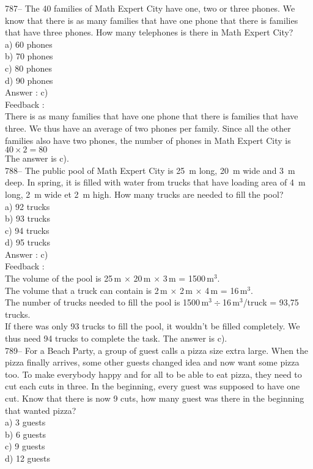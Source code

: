 \documentclass[letterpaper, 12pt]{article}
\begin{document}
787-- The 40 families of Math Expert City have one, two or three phones. We know that there is as many families that have one phone that there is families that have three phones. How many telephones is there in Math Expert City?\\
a) 60 phones\\
b) 70 phones\\
c) 80 phones\\
d) 90 phones\\

Answer : c)\\

Feedback : \\
There is as many families that have one phone that there is families that have three. We thus have an average of two phones per family. Since all the other families also have two phones, the number of phones in Math Expert City is $40\times2=80$\\
The answer is c).\\

788-- The public pool of Math Expert City is 25~m long, 20~m wide and 3~m deep. In spring, it is filled with water from trucks that have loading area of 4~m long, 2~m wide et 2~m high.
How many trucks are needed to fill the pool? \\
a) 92 trucks\\
b) 93 trucks\\
c) 94 trucks\\
d) 95 trucks\\

Answer : c)\\

Feedback : \\
The volume of the pool is 25\,m $\times$ 20\,m $\times$ 3\,m =
1500\,m$^{3}$.\\
The volume that a truck can contain is 2\,m $\times$ 2\,m $\times$ 4\,m =
16\,m$^{3}$.\\
The number of trucks needed to fill the pool is
1500\,m$^{3}\div$16\,m$^{3}$/truck = 93,75 trucks.\\
If there was only 93 trucks to fill the pool, it wouldn't be filled completely. We thus need 94 trucks to complete the task. The answer is c).\\

789-- For a \og Beach Party\fg , a group of guest calls a pizza size extra large. When the pizza finally arrives, some other guests changed idea and now want some pizza too. To make everybody happy and for all to be able to eat pizza, they need to cut each cuts in three. In the beginning, every guest was supposed to have one cut. Know that there is now 9 cuts, how many guest was there in the beginning that wanted pizza?\\
a) 3 guests\\
b) 6 guests\\
c) 9 guests\\
d) 12 guests\\
\end{document}
